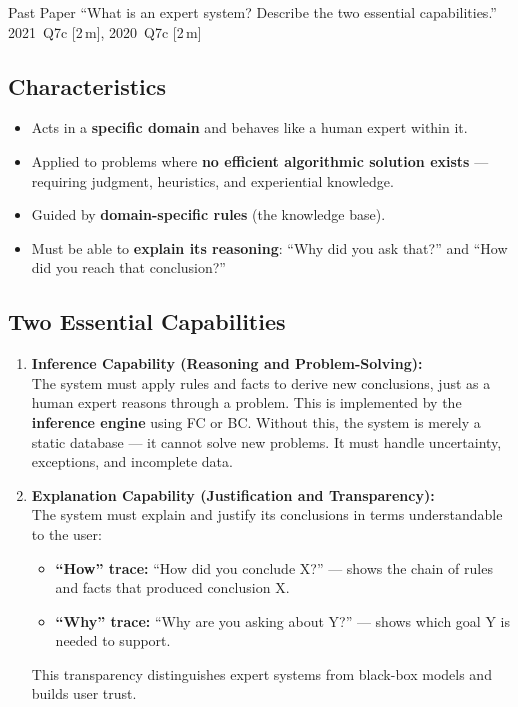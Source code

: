 \documentclass[12pt,a4paper]{article}
\begin{document}
\begin{exambox}{Past Paper}
``What is an expert system? Describe the two essential capabilities.''\\
2021~Q7c [2\,m], 2020~Q7c [2\,m]
\end{exambox}

\subsection{Characteristics}

\begin{itemize}[itemsep=4pt]
  \item Acts in a \textbf{specific domain} and behaves like a human expert within it.
  \item Applied to problems where \textbf{no efficient algorithmic solution exists} ---
        requiring judgment, heuristics, and experiential knowledge.
  \item Guided by \textbf{domain-specific rules} (the knowledge base).
  \item Must be able to \textbf{explain its reasoning}: ``Why did you ask that?''
        and ``How did you reach that conclusion?''
\end{itemize}

\subsection{Two Essential Capabilities}

\begin{enumerate}[itemsep=8pt]
  \item \textbf{Inference Capability (Reasoning and Problem-Solving):}\\
        The system must apply rules and facts to derive new conclusions,
        just as a human expert reasons through a problem.
        This is implemented by the \textbf{inference engine} using FC or BC.
        Without this, the system is merely a static database --- it cannot solve new problems.
        It must handle uncertainty, exceptions, and incomplete data.

  \item \textbf{Explanation Capability (Justification and Transparency):}\\
        The system must explain and justify its conclusions in terms understandable to the user:
        \begin{itemize}
          \item \textbf{``How'' trace:} ``How did you conclude X?'' ---
                shows the chain of rules and facts that produced conclusion X.
          \item \textbf{``Why'' trace:} ``Why are you asking about Y?'' ---
                shows which goal Y is needed to support.
        \end{itemize}
        This transparency distinguishes expert systems from black-box models and
        builds user trust.
\end{enumerate}
\end{document}

